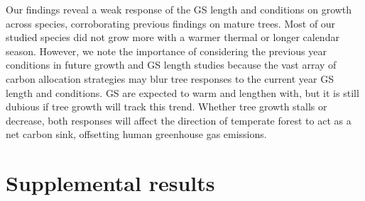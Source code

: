 \documentclass{article}\usepackage[]{graphicx}\usepackage[]{xcolor}
\begin{document}
Our findings reveal a weak response of the GS length and conditions on growth across species, corroborating previous findings on mature trees. Most of our studied species did not grow more with a warmer thermal or longer calendar season. However, we note the importance of considering the previous year conditions in future growth and GS length studies because the vast array of carbon allocation strategies may blur tree responses to the current year GS length and conditions. GS are expected to warm and lengthen with, but it is still dubious if tree growth will track this trend. Whether tree growth stalls or decrease, both responses will affect the direction of temperate forest to act as a net carbon sink, offsetting human greenhouse gas emissions. %

\clearpage
\clearpage
\section*{Supplemental results}

\setcounter{table}{0}
\renewcommand{\thetable}{S\arabic{table}}
\setcounter{figure}{0}
\renewcommand{\thefigure}{S\arabic{figure}}
\end{document}

